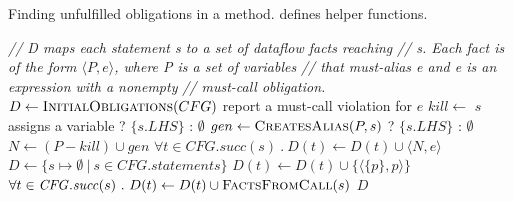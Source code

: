 \begin{algorithm}[t]
  \caption{Finding unfulfilled \MustCall obligations in a method.
     defines helper functions.}
  \label{alg:consistency-checker}
  \begin{algorithmic}[1]
  \State \textit{// D maps each statement s to a set of dataflow facts reaching}
  \State \textit{// s.  Each fact is of the form $\langle P, e \rangle$, where P is a set of variables}
  \State \textit{// that must-alias e and e is an expression with a nonempty}
  \State \textit{// must-call obligation.}
  \State $D \gets \textsc{InitialObligations}(CFG)$ \label{li:call-initial-obs}
     \label{li:end-scope}
      \State report a must-call violation for $e$
     \label{li:check-satisfied}
    \State $kill \gets $ $s$ assigns a variable ? $\{s.LHS\}$ : $\emptyset$ \label{li:compute-kill}
    \State $gen \gets \textsc{CreatesAlias}(P,s)$ ? $\{s.LHS\}$ : $\emptyset$ \label{li:compute-gen} 
    \State $N \gets (P - kill) \cup gen$ \label{li:compute-new-mc-aliases}
    \State $\forall t \in \mathit{CFG.succ}(s)\ .\ D(t) \leftarrow D(t) \cup \langle
    N, e \rangle$ \label{li:prop-to-succs}
    \EndIf
    \EndFor
  \EndWhile \label{li:alg-loop-end}
  \EndProcedure
  \State $D \gets \{ s \mapsto \emptyset\ |\ s \in \mathit{CFG.statements} \}$\label{li:start-init}
  \label{li:init-formals}
      \State $D(t) \gets D(t) \cup \lbrace \langle \{p\}, p \rangle \rbrace$
    \EndIf
  \EndFor \label{li:end-init-formals}
   \label{li:init-calls}
    \State $\forall t \in \mathit{CFG.succ}(s)\ .\ D(t) \leftarrow D(t) \cup \textsc{FactsFromCall}(s)$
  \EndFor  \label{li:end-init}
  \State \Return $D$
  \EndProcedure
  \end{algorithmic}
\end{algorithm}

